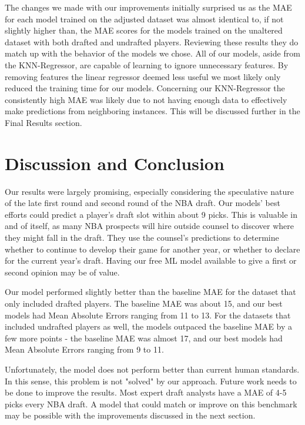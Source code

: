 \documentclass{article}
\begin{document}
The changes we made with our improvements initially surprised us as the MAE for
each model trained on the adjusted dataset was almost identical to, if not
slightly higher than, the MAE scores for the models trained on the unaltered
dataset with both drafted and undrafted players. Reviewing these results they do
match up with the behavior of the models we chose. All of our models, aside from
the KNN-Regressor, are capable of learning to ignore unnecessary features. By
removing features the linear regressor deemed less useful we most likely only
reduced the training time for our models. Concerning our KNN-Regressor the
consistently high MAE was likely due to not having enough data to effectively
make predictions from neighboring instances. This will be discussed further in
the Final Results section.

\section{Discussion and Conclusion}

Our results were largely promising, especially considering the speculative
nature of the late first round and second round of the NBA draft. Our models'
best efforts could predict a player's draft slot within about 9 picks. This is
valuable in and of itself, as many NBA prospects will hire outside counsel to
discover where they might fall in the draft. They use the counsel's predictions
to determine whether to continue to develop their game for another year, or
whether to declare for the current year's draft. Having our free ML model
available to give a first or second opinion may be of value.

Our model performed slightly better than the baseline MAE for the dataset that
only included drafted players. The baseline MAE was about 15, and our best
models had Mean Absolute Errors ranging from 11 to 13. For the datasets that
included undrafted players as well, the models outpaced the baseline MAE by a
few more points - the baseline MAE was almost 17, and our best models had Mean
Absolute Errors ranging from 9 to 11.

Unfortunately, the model does not perform better than current human standards.
In this sense, this problem is not "solved" by our approach. Future work needs
to be done to improve the results. Most expert draft analysts have a MAE of 4-5
picks every NBA draft. A model that could match or improve on this benchmark may
be possible with the improvements discussed in the next section.
\end{document}
